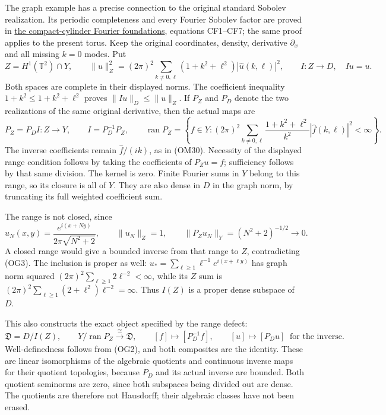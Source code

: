 \documentclass[
  11pt,
]{article}
\begin{document}
The graph example has a precise connection to the original standard
Sobolev realization. Its periodic completeness and every Fourier Sobolev
factor are proved in
\href{arbitrary-boundary-data-reduction.pdf}{the
compact-cylinder Fourier foundations}, equations CF1--CF7; the same
proof applies to the present torus. Keep the original coordinates,
density, derivative \(\partial_x\) and all missing \(k=0\) modes. Put \[
 Z=H^1(\mathbb T^2)\cap Y,\qquad
 \|u\|_Z^2=(2\pi)^2
    \sum_{k\ne0,\ell}(1+k^2+\ell^2)|\widehat u(k,\ell)|^2,
 \qquad I:Z\longrightarrow D,\quad Iu=u .
 \tag{OG1}
\] Both spaces are complete in their displayed norms. The coefficient
inequality \(1+k^2\leq1+k^2+\ell^2\) proves \(\|Iu\|_D\leq\|u\|_Z\). If
\(P_Z\) and \(P_D\) denote the two realizations of the same original
derivative, then the actual maps are \[
 P_Z=P_D I:Z\longrightarrow Y,\qquad
 I=P_D^{-1}P_Z,\qquad
 \operatorname{ran}P_Z
 =\left\{f\in Y:(2\pi)^2
    \sum_{k\ne0,\ell}\frac{1+k^2+\ell^2}{k^2}
                  |\widehat f(k,\ell)|^2<\infty\right\}.
 \tag{OG2}
\] The inverse coefficients remain \(\widehat f/(ik)\), as in (OM30).
Necessity of the displayed range condition follows by taking the
coefficients of \(P_Zu=f\); sufficiency follows by that same division.
The kernel is zero. Finite Fourier sums in \(Y\) belong to this range,
so its closure is all of \(Y\). They are also dense in \(D\) in the
graph norm, by truncating its full weighted coefficient sum.

The range is not closed, since \[
 u_N(x,y)=\frac{e^{i(x+Ny)}}{2\pi\sqrt{N^2+2}},\qquad
 \|u_N\|_Z=1,\qquad
 \|P_Zu_N\|_Y=(N^2+2)^{-1/2}\longrightarrow0.
 \tag{OG3}
\] A closed range would give a bounded inverse from that range to \(Z\),
contradicting (OG3). The inclusion is proper as well:
\(u_*=\sum_{\ell\geq1}\ell^{-1}e^{i(x+\ell y)}\) has graph norm squared
\((2\pi)^2\sum_{\ell\geq1}2\ell^{-2}<\infty\), while its \(Z\) sum is
\((2\pi)^2\sum_{\ell\geq1}(2+\ell^2)\ell^{-2}=\infty\). Thus \(I(Z)\) is
a proper dense subspace of \(D\).

This also constructs the exact object specified by the range defect: \[
 \mathfrak D=D/I(Z),\qquad
 Y/\operatorname{ran}P_Z\xrightarrow{\;\cong\;}\mathfrak D,\qquad
 [f]\longmapsto[P_D^{-1}f],\qquad
 [u]\longmapsto[P_Du]\ \text{ for the inverse}.
 \tag{OG4}
\] Well-definedness follows from (OG2), and both composites are the
identity. These are linear isomorphisms of the algebraic quotients and
continuous inverse maps for their quotient topologies, because \(P_D\)
and its actual inverse are bounded. Both quotient seminorms are zero,
since both subspaces being divided out are dense. The quotients are
therefore not Hausdorff; their algebraic classes have not been erased.
\end{document}
